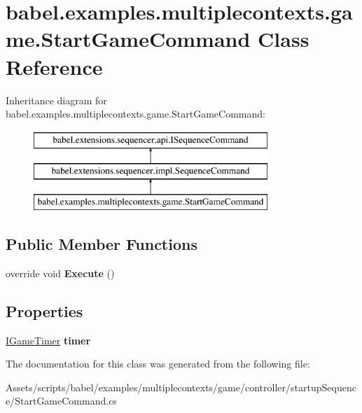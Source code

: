 \hypertarget{classbabel_1_1examples_1_1multiplecontexts_1_1game_1_1_start_game_command}{\section{babel.\-examples.\-multiplecontexts.\-game.\-Start\-Game\-Command Class Reference}
\label{classbabel_1_1examples_1_1multiplecontexts_1_1game_1_1_start_game_command}
}
Inheritance diagram for babel.\-examples.\-multiplecontexts.\-game.\-Start\-Game\-Command\-:\begin{figure}[H]
\begin{center}
\leavevmode
\includegraphics[height=3.000000cm]{classbabel_1_1examples_1_1multiplecontexts_1_1game_1_1_start_game_command}
\end{center}
\end{figure}
\subsection*{Public Member Functions}
\begin{DoxyCompactItemize}
\item 
\hypertarget{classbabel_1_1examples_1_1multiplecontexts_1_1game_1_1_start_game_command_a3a2fb392d0916f1c024781af6b7b4330}{override void {\bfseries Execute} ()}\label{classbabel_1_1examples_1_1multiplecontexts_1_1game_1_1_start_game_command_a3a2fb392d0916f1c024781af6b7b4330}

\end{DoxyCompactItemize}
\subsection*{Properties}
\begin{DoxyCompactItemize}
\item 
\hypertarget{classbabel_1_1examples_1_1multiplecontexts_1_1game_1_1_start_game_command_a8cbb4329febe4e987ab990a3f6b556ef}{\hyperlink{interfacebabel_1_1examples_1_1multiplecontexts_1_1game_1_1_i_game_timer}{I\-Game\-Timer} {\bfseries timer}}\label{classbabel_1_1examples_1_1multiplecontexts_1_1game_1_1_start_game_command_a8cbb4329febe4e987ab990a3f6b556ef}

\end{DoxyCompactItemize}


The documentation for this class was generated from the following file\-:\begin{DoxyCompactItemize}
\item 
Assets/scripts/babel/examples/multiplecontexts/game/controller/startup\-Sequence/Start\-Game\-Command.\-cs\end{DoxyCompactItemize}
